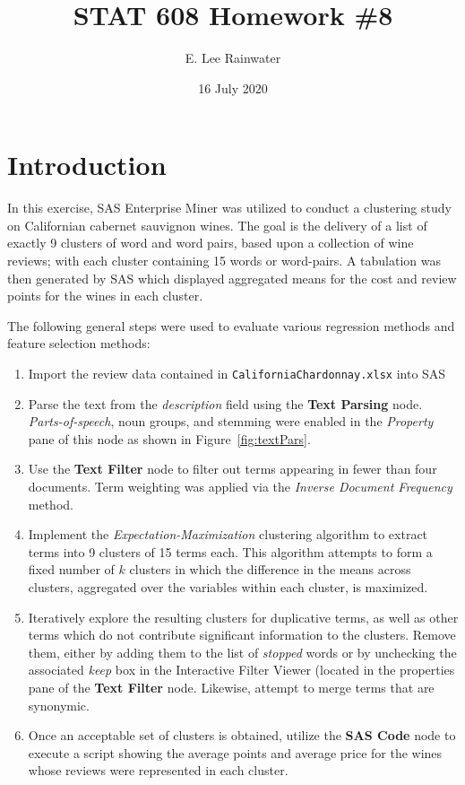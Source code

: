 \documentclass[12pt]{article}
\title{STAT 608 Homework \#8}
\author{E. Lee Rainwater}
\date{16 July 2020}
\begin{document}
\maketitle

\section{Introduction}
In this exercise, SAS Enterprise Miner\textsuperscript{\textregistered} was utilized to conduct a clustering study on Californian cabernet sauvignon wines. The goal is the delivery of a list of exactly 9 clusters of word and word pairs, based upon a collection of wine reviews; with each cluster containing 15 words or word-pairs. A tabulation was then generated by SAS which displayed aggregated means for the cost and review points for the wines in each cluster.


The following general steps were used to evaluate various regression
methods and feature selection methods: 
\begin{enumerate}
\item Import the review data contained in  \texttt{CaliforniaChardonnay.xlsx} into SAS
\item Parse the text from the \textit{description} field using the \textbf{Text Parsing} node. \textit{Parts-of-speech}, noun groups, and stemming were enabled in the \textit{Property} pane of this node as shown in Figure~\ref{fig:textPars}.
\item Use the \textbf{Text Filter} node to filter out terms appearing in fewer than four documents. Term weighting was applied via the \textit{Inverse Document Frequency} method.
\item Implement the \textit{Expectation-Maximization} clustering algorithm to extract terms into 9 clusters of 15 terms each. This algorithm attempts to form a fixed number of $k$ clusters in which the difference in the means across clusters, aggregated over the variables within each cluster, is maximized.
\item Iteratively explore the resulting clusters for duplicative terms, as well as other terms which do not contribute significant information to the clusters. Remove them, either by adding them to the list of \textit{stopped} words or by unchecking the associated \textit{keep} box in the Interactive Filter Viewer (located in the properties pane of the \textbf{Text Filter} node. Likewise, attempt to merge terms that are synonymic.
\item Once an acceptable set of clusters is obtained, utilize the \textbf{SAS Code} node to execute a script showing the average points and average price for the wines whose reviews were represented in each cluster.
\end{enumerate}
\end{document}
